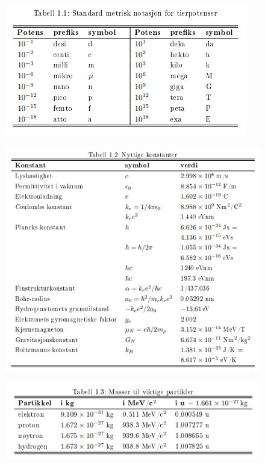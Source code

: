 \begin{figure}[ht!]
  \centering
  \includegraphics[scale = 1]{Figures/Metric power notation.png}
  \caption{}
  \label{fig: Metric power notation}
\end{figure}

\begin{figure}[ht!]
  \centering
  \includegraphics[scale = 1]{Figures/Constants table.png}
  \caption{}
  \label{fig: Constants table}
\end{figure}

\begin{figure}[ht!]
  \centering
  \includegraphics[scale = 1]{Figures/Masser til viktige partikler.png}
  \caption{}
  \label{fig: Masser til viktige partikler}
\end{figure}

